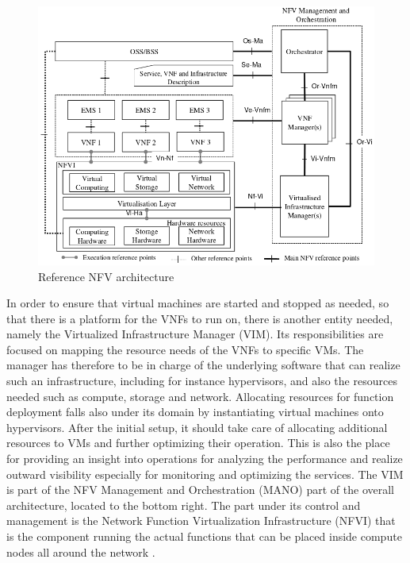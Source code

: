 \begin{figure}[H]
	\centering
	\includegraphics[width=1\linewidth]{images/nfv_ref_arch.png}
	\caption{Reference NFV architecture \cite{etsi1etsi}}
	\label{img:nfv_ref_arch}
\end{figure}

In order to ensure that virtual machines are started and stopped as needed, so that there is a platform for the VNFs to run on, there is another entity needed, namely the Virtualized Infrastructure Manager (VIM). Its responsibilities are focused on mapping the resource needs of the VNFs to specific VMs. The manager has therefore to be in charge of the underlying software that can realize such an infrastructure, including for instance hypervisors, and also the resources needed such as compute, storage and network. Allocating resources for function deployment falls also under its domain by instantiating virtual machines onto hypervisors. After the initial setup, it should take care of allocating additional resources to VMs and further optimizing their operation. This is also the place for providing an insight into operations for analyzing the performance and realize outward visibility especially for monitoring and optimizing the services. 
The VIM is part of the NFV Management and Orchestration (MANO) part of the overall architecture, located to the bottom right. The part under its control and management is the Network Function Virtualization Infrastructure (NFVI) that is the component running the actual functions that can be placed inside compute nodes all around the network \cite{nfv_etsi}. 

